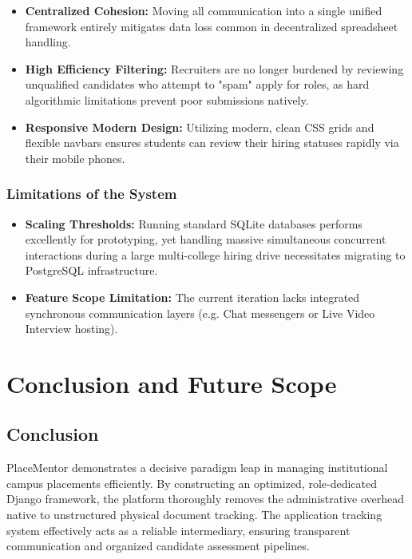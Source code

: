 \documentclass[a4paper,12pt]{report}
\begin{document}
\begin{itemize}
    \item \textbf{Centralized Cohesion:} Moving all communication into a single unified framework entirely mitigates data loss common in decentralized spreadsheet handling.

    \item \textbf{High Efficiency Filtering:} Recruiters are no longer burdened by reviewing unqualified candidates who attempt to "spam" apply for roles, as hard algorithmic limitations prevent poor submissions natively.

    \item \textbf{Responsive Modern Design:} Utilizing modern, clean CSS grids and flexible navbars ensures students can review their hiring statuses rapidly via their mobile phones.
\end{itemize}

\subsection{Limitations of the System}

\begin{itemize}
    \item \textbf{Scaling Thresholds:} Running standard SQLite databases performs excellently for prototyping, yet handling massive simultaneous concurrent interactions during a large multi-college hiring drive necessitates migrating to PostgreSQL infrastructure.
    
    \item \textbf{Feature Scope Limitation:} The current iteration lacks integrated synchronous communication layers (e.g. Chat messengers or Live Video Interview hosting).
\end{itemize}

\chapter{Conclusion and Future Scope}

\section{Conclusion}

PlaceMentor demonstrates a decisive paradigm leap in managing institutional campus placements efficiently. By constructing an optimized, role-dedicated Django framework, the platform thoroughly removes the administrative overhead native to unstructured physical document tracking. The application tracking system effectively acts as a reliable intermediary, ensuring transparent communication and organized candidate assessment pipelines.
\end{document}

